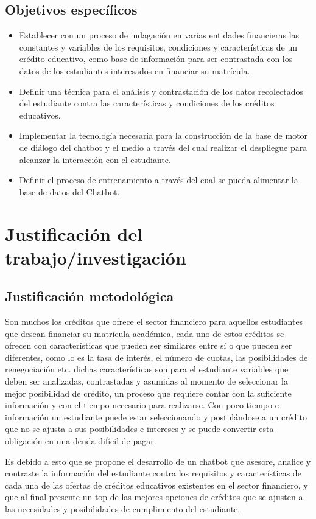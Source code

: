 \subsection{Objetivos específicos}
\begin{itemize}
	\item Establecer con un proceso de indagación en varias entidades financieras las constantes y variables de los requisitos, condiciones y características de un crédito educativo, como base de información para ser contrastada con los datos de los estudiantes interesados en financiar su matrícula.
	\item Definir una técnica para el análisis y contrastación de los datos recolectados del estudiante contra las características y condiciones de los créditos educativos.
	\item Implementar la tecnología necesaria para la construcción de la base de motor de diálogo del chatbot y el medio a través del cual realizar el despliegue para alcanzar la interacción con el estudiante.
	\item Definir el proceso de entrenamiento a través del cual se pueda alimentar la base de datos del Chatbot.
\end{itemize}
\newpage

\section{Justificación del trabajo/investigación}
\subsection{Justificación metodológica}
Son muchos los créditos que ofrece el sector financiero para aquellos estudiantes que desean financiar su matrícula académica, cada uno de estos créditos se ofrecen con características que pueden ser similares entre sí o que pueden ser diferentes, como lo es la tasa de interés, el número de cuotas, las posibilidades de renegociación etc. dichas características son para el estudiante variables que deben ser analizadas, contrastadas y asumidas al momento de seleccionar la mejor posibilidad de crédito, un proceso que requiere contar con la suficiente información y con el tiempo necesario para realizarse. Con poco tiempo e información un estudiante puede estar seleccionando y postulándose a un crédito que no se ajusta a sus posibilidades e intereses y se puede convertir esta obligación en una deuda difícil de pagar.

Es debido a esto que se propone el desarrollo de un chatbot que asesore, analice y contraste la información del estudiante contra los requisitos y características de cada una de las ofertas de créditos educativos existentes en el sector financiero, y que al final presente un top de las mejores opciones de créditos que se ajusten a las necesidades y posibilidades de cumplimiento del estudiante.
\newpage


